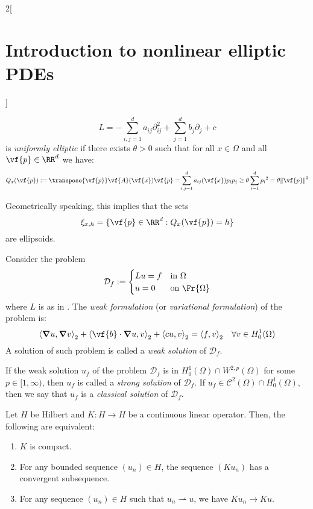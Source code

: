 \documentclass[../../../main_math.tex]{subfiles}
\begin{document}
\begin{multicols}{2}[\section{Introduction to nonlinear elliptic PDEs}]
\begin{definition}
    \begin{equation}\label{INEPDE:operator}
      L=-\sum_{i,j=1}^da_{ij}\partial_{ij}^2 + \sum_{j=1}^d b_j\partial_j+c
    \end{equation}
    is \emph{uniformly elliptic} if there exists $\theta>0$ such that for all $x\in \Omega$ and all $\vf{p}\in \RR^d$ we have:
    \begin{equation*}
      Q_x(\vf{p}):=\transpose{\vf{p}}\vf{A}(\vf{x})\vf{p}=\!\sum_{i,j=1}^da_{ij}(\vf{x})p_ip_j\geq \theta \sum_{i=1}^{d} {p_i}^2=\theta \norm{\vf{p}}^2
    \end{equation*}
  \end{definition}
  \begin{remark}
    Geometrically speaking, this implies that the sets
    $$
      \xi_{x,h}=\{ \vf{p}\in \RR^d: Q_x(\vf{p})=h\}
    $$
    are ellipsoids.
  \end{remark}
  \begin{definition}
    Consider the problem
    $$
      \mathcal{D}_f:=\begin{cases}
        Lu=f & \text{in }\Omega      \\
        u=0  & \text{on }\Fr{\Omega}
      \end{cases}
    $$
    where $L$ is as in . The \emph{weak formulation} (or \emph{variational formulation}) of the problem is:
    \begin{equation*}
      {\langle \grad u,\grad v\rangle}_2+{\langle \vf{b}\cdot \grad u,v\rangle}_2 + {\langle cu,v\rangle}_2={\langle f,v\rangle}_2\quad \forall v\in H_0^1(\Omega)
    \end{equation*}
    A solution of such problem is called a \emph{weak solution} of $\mathcal{D}_f$.
  \end{definition}
  \begin{definition}
    If the weak solution $u_f$ of the problem $\mathcal{D}_f$ is in $H^1_0(\Omega)\cap W^{2,p}(\Omega)$ for some $p\in [1,\infty)$, then $u_f$ is called a \emph{strong solution} of $\mathcal{D}_f$. If $u_f\in \mathcal{C}^2(\Omega)\cap H^1_0(\Omega)$, then we say that $u_f$ is a \emph{classical solution} of $\mathcal{D}_f$.
  \end{definition}
  \begin{proposition}
    Let $H$ be Hilbert and $K:H\to H$ be a continuous linear operator. Then, the following are equivalent:
    \begin{enumerate}
      \item $K$ is compact.
      \item For any bounded sequence $(u_n)\in H$, the sequence $(Ku_n)$ has a convergent subsequence.
      \item For any sequence $(u_n)\in H$ such that $u_n\rightharpoonup u$, we have $Ku_n\to Ku$.
    \end{enumerate}
  \end{proposition}

\end{multicols}
\end{document}
